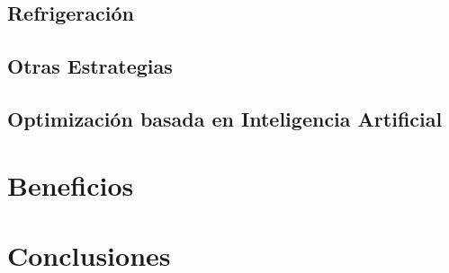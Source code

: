 \documentclass[10pt]{article}
\begin{document}
		\subsection{Refrigeración}

			\paragraph{}


		\subsection{Otras Estrategias}

			\paragraph{}

		\subsection{Optimización basada en Inteligencia Artificial}

			\paragraph{}


  \section{Beneficios}
	\label{sec:beneficios}

  	\paragraph{}

  \section{Conclusiones}
	\label{sec:conclusiones}
\end{document}
